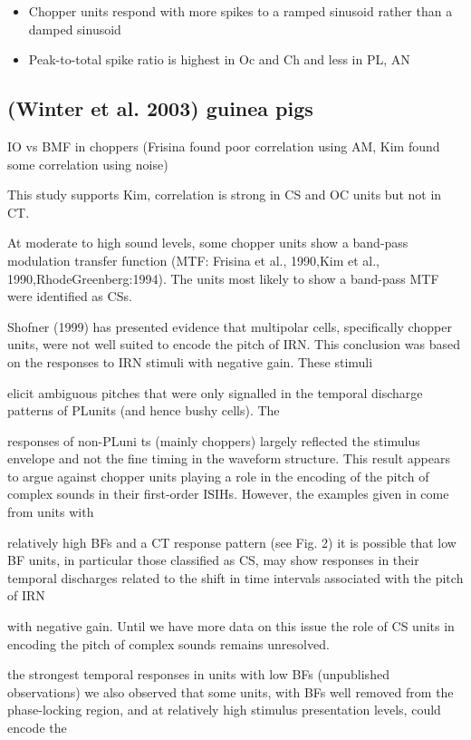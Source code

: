 \documentclass[10pt,a4paper]{article}
\begin{document}
\begin{itemize}
\item Chopper units respond with more spikes to a ramped sinusoid rather than a
  damped sinusoid
\item Peak-to-total spike ratio is highest in Oc and Ch and less in PL, AN
\end{itemize}

\subsection{(Winter et al. 2003) guinea pigs}

IO vs BMF in choppers (Frisina found poor correlation using AM, Kim found some
correlation using noise)

This study supports Kim, correlation is strong in CS and OC units but not in CT.

At moderate to high sound levels, some chopper units show a band-pass modulation
transfer function (MTF: Frisina et al., 1990,Kim et al.,
1990,RhodeGreenberg:1994). The units most likely to show a band-pass MTF were
identified as CSs.

Shofner (1999) has presented evidence that multipolar cells, specifically
chopper units, were not well suited to encode the pitch of IRN. This conclusion
was based on the responses to IRN stimuli with negative gain. These stimuli

\label{tab:Winter2003}
elicit ambiguous pitches that were only signalled in the temporal discharge
patterns of PLunits (and hence bushy cells). The

responses of non-PLuni ts (mainly choppers) largely reflected the stimulus
envelope and not the fine timing in the waveform structure.  This result appears
to argue against chopper units playing a role in the encoding of the pitch of
complex sounds in their first-order ISIHs.  However, the examples given in
\citep{Shofner:1999} come from units with

relatively high BFs and a CT response pattern (see Fig. 2) it is possible that
low BF units, in particular those classified as CS, may show responses in their
temporal discharges related to the shift in time intervals associated with the
pitch of IRN

with negative gain. Until we have more data on this issue the role of CS units
in encoding the pitch of complex sounds remains unresolved.

the strongest temporal responses in units with low BFs (unpublished
observations) we also observed that some units, with BFs well removed from the
phase-locking region, and at relatively high stimulus presentation levels, could
encode the
\end{document}
